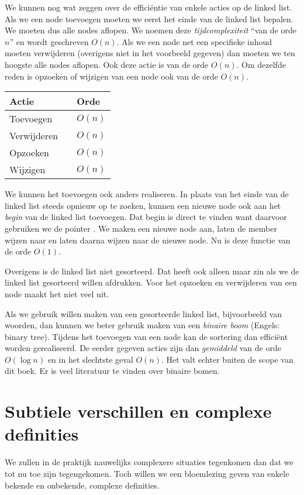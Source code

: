 We kunnen nog wat zeggen over de efficiëntie van enkele acties op de linked list. Als we een node toevoegen moeten we eerst het einde van de linked list bepalen. We moeten dus alle nodes aflopen. We noemen deze \textsl{tijdcomplexiteit} ``van de orde $n$'' en wordt geschreven $O(n)$. Als we een node net een specifieke inhoud moeten verwijderen (overigens niet in het voorbeeld gegeven) dan moeten we ten hoogste alle nodes aflopen. Ook deze actie is van de orde $O(n)$. Om dezelfde reden is opzoeken of wijzigen van een node ook van de orde $O(n)$.

\begin{table}[!ht]
\begin{tabular}{lp{1em}l}
Actie && Orde \\
\midrule
Toevoegen && $O(n)$ \\
Verwijderen && $O(n)$ \\
Opzoeken && $O(n)$ \\
Wijzigen && $O(n)$
\end{tabular}
\end{table}
\basic

We kunnen het toevoegen ook anders realiseren. In plaats van het einde van de linked list steeds opnieuw op te zoeken, kunnen een nieuwe node ook aan het \textsl{begin} van de linked list toevoegen. Dat begin is direct te vinden want daarvoor gebruiken we de pointer . We maken een nieuwe node aan, laten de member  wijzen naar  en laten daarna  wijzen naar de nieuwe node. Nu is deze functie van de orde $O(1)$.

Overigens is de linked list niet gesorteerd. Dat heeft ook alleen maar zin als we de linked list gesorteerd willen afdrukken. Voor het opzoeken en verwijderen van een node maakt het niet veel uit.

Als we gebruik willen maken van een gesorteerde linked list, bijvoorbeeld van woorden, dan kunnen we beter gebruik maken van een \textsl{binaire boom} (Engels: binary tree). Tijdens het toevoegen van een node kan de sortering dan efficiënt worden gerealiseerd. De eerder gegeven acties zijn dan \textsl{gemiddeld} van de orde $O(\log n)$ en in het slechtste geval $O(n)$. Het valt echter buiten de scope van dit boek. Er is veel literatuur te vinden over binaire bomen. 

\section{Subtiele verschillen en complexe definities}
We zullen in de praktijk nauwelijks complexere situaties tegenkomen dan dat we tot nu toe zijn tegengekomen. Toch willen we een bloemlezing geven van enkele bekende en onbekende, complexe definities.

